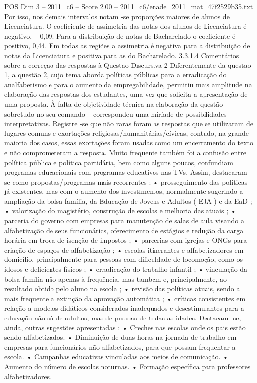\begin{textsample}{POS Dim 3 – 2011\_c6 – Score 2.00 – 2011\_c6/enade\_2011\_mat\_47f2529b35.txt}
Por isso, nos demais intervalos notam -se proporções maiores de alunos de Licenciatura.
O coeficiente de assimetria das notas dos alunos de Licenciatura é negativo, – 0,09.
Para a distribuição de notas de Bacharelado o coeficiente é positivo, 0,44.
Em todas as regiões a assimetria é negativa para a distribuição de notas da Licenciatura e positiva para as do Bacharelado. 3.3.1.4 Comentários sobre a correção das respostas à Questão Discursiva 2 Diferentemente da questão 1, a questão 2, cujo tema aborda políticas públicas para a erradicação do analfabetismo e para o aumento da empregabilidade, permitiu mais amplitude na elaboração das respostas dos estudantes, uma vez que solicita a apresentação de uma proposta.
À falta de objetividade técnica na elaboração da questão – sobretudo no seu comando – correspondeu uma miríade de possibilidades interpretativas.
Registre -se que não raras foram as respostas que se utilizaram de lugares comuns e exortações religiosas/humanitárias/cívicas, contudo, na grande maioria dos casos, essas exortações foram usadas como um encerramento do texto e não comprometeram a resposta.
Muito frequente também foi a confusão entre política pública e política partidária, bem como alguns poucos, confundiam programas educacionais com programas educativos nas TVs.
Assim, destacaram -se como propostas/programas mais recorrentes : • prosseguimento das políticas já existentes, mas com o aumento dos investimentos, normalmente sugerindo a ampliação da bolsa família, da Educação de Jovens e Adultos ( EJA ) e da EaD ; • valorização do magistério, construção de escolas e melhoria das atuais ; • parceria do governo com empresas para manutenção de salas de aula visando a alfabetização de seus funcionários, oferecimento de estágios e redução da carga horária em troca de isenção de impostos ; • parcerias com igrejas e ONGs para criação de espaços de alfabetização ; • escolas itinerantes e alfabetizadores em domicílio, principalmente para pessoas com dificuldade de locomoção, como os idosos e deficientes físicos ; • erradicação do trabalho infantil ; • vinculação da bolsa família não apenas à frequência, mas também e, principalmente, ao resultado obtido pelo aluno na escola ; • revisão das políticas atuais, sendo a mais frequente a extinção da aprovação automática ; • críticas consistentes em relação a modelos didáticos considerados inadequados e desestimulantes para a educação não só de adultos, mas de pessoas de todas as idades.
Destacam -se, ainda, outras sugestões apresentadas : • Creches nas escolas onde os pais estão sendo alfabetizados. • Diminuição de duas horas na jornada de trabalho em empresas para funcionários não alfabetizados, para que possam frequentar a escola. • Campanhas educativas vinculadas aos meios de comunicação. • Aumento do número de escolas noturnas. • Formação específica para professores alfabetizadores.

\end{textsample}
